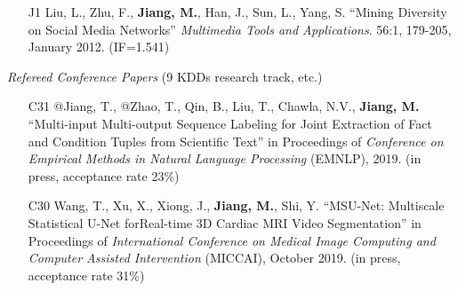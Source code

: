 \documentclass[10pt]{article}
\newenvironment{myindentpar}[1]%
{\begin{list}{}%
         {\setlength{\leftmargin}{#1}}%
         \item[]%
}
{\end{list}}
\newcounter{list}
\begin{document}
\begin{myindentpar}{0.00cm}
\begin{enumerate}[leftmargin=.5cm]
\vspace{-0.1cm}
\vspace{0.15cm}

\item[J1] Liu, L., Zhu, F., \textbf{Jiang, M.}, Han, J., Sun, L., Yang, S. ``Mining Diversity on Social Media Networks'' \textit{Multimedia Tools and Applications}. 56:1, 179-205, January 2012. (IF=1.541)

\vspace{-0.1cm}

\end{enumerate}

\hspace{-0.25cm}\emph{Refereed Conference Papers} (9 KDDs research track, etc.)

\begin{enumerate}[leftmargin=.5cm]

\item[C31] @Jiang, T., @Zhao, T., Qin, B., Liu, T., Chawla, N.V., \textbf{Jiang, M.} ``Multi-input Multi-output Sequence Labeling for Joint Extraction of Fact and Condition Tuples from Scientific Text'' in Proceedings of \textit{Conference on Empirical Methods in Natural Language Processing} (EMNLP), 2019. (in press, acceptance rate 23\%)

\vspace{-0.1cm}

\item[C30] Wang, T., Xu, X., Xiong, J., \textbf{Jiang, M.}, Shi, Y. ``MSU-Net: Multiscale Statistical U-Net forReal-time 3D Cardiac MRI Video Segmentation'' in Proceedings of \textit{International Conference on Medical Image Computing and Computer Assisted Intervention} (MICCAI), October 2019. (in press, acceptance rate 31\%)		

\vspace{-0.1cm}


\end{enumerate}
\end{myindentpar}
\end{document}
